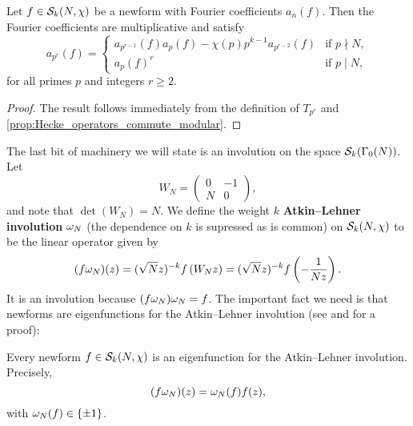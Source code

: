       \begin{proposition}\label{prop:newform_Fourier_coefficient_recurrence_modular}
        Let $f \in \mathcal{S}_{k}(N,\chi)$ be a newform with Fourier coefficients $a_{n}(f)$. Then the Fourier coefficients are multiplicative and satisfy
        \[
          a_{p^{r}}(f) = \begin{cases} a_{p^{r-1}}(f)a_{p}(f)-\chi(p)p^{k-1}a_{p^{r-2}}(f) & \text{if $p \nmid N$}, \\ a_{p}(f)^{r} & \text{if $p \mid N$}, \end{cases}
        \]
        for all primes $p$ and integers $r \ge 2$.
      \end{proposition}
      \begin{proof}
        The result follows immediately from the definition of $T_{p^{r}}$ and \cref{prop:Hecke_operators_commute_modular}.
      \end{proof}
      
      The last bit of machinery we will state is an involution on the space $\mathcal{S}_{k}(\Gamma_{0}(N))$. Let
      \[
        W_{N} = \begin{pmatrix} 0 & -1 \\ N & 0 \end{pmatrix},
      \]
      and note that $\det(W_{N}) = N$. We define the weight $k$ \textbf{Atkin–Lehner involution} $\omega_{N}$ (the dependence on $k$ is supressed as is common) on $\mathcal{S}_{k}(N,\chi)$ to be the linear operator given by
      \[
        (f\omega_{N})(z) = (\sqrt{N}z)^{-k}f\left(W_{N}z\right) = (\sqrt{N}z)^{-k}f\left(-\frac{1}{Nz}\right).
      \]
      It is an involution because $(f\omega_{N})\omega_{N} = f$. The important fact we need is that newforms are eigenfunctions for the Atkin–Lehner involution (see \cite{miyake1989modular} and \cite{diamond2005first} for a proof):

      \begin{proposition}\label{prop:Atkin_Lehner_involution_preserves_subspaces}
        Every newform $f \in \mathcal{S}_{k}(N,\chi)$ is an eigenfunction for the Atkin–Lehner involution. Precisely,
        \[
          (f\omega_{N})(z) = \omega_{N}(f)f(z),
        \]
        with $\omega_{N}(f) \in \{\pm1\}$.
      \end{proposition}
